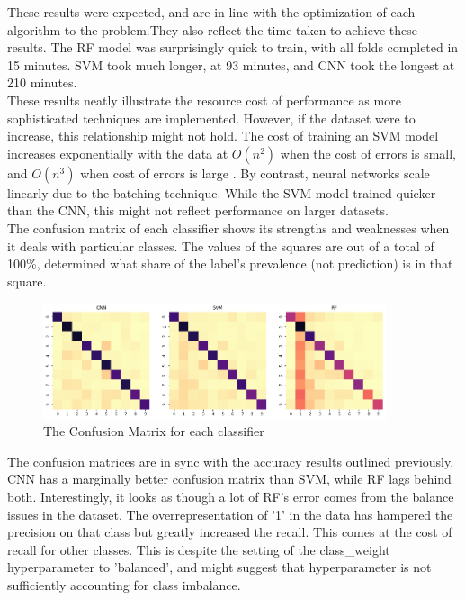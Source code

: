 \documentclass[12pt]{article}
\begin{document}
These results were expected, and are in line with the optimization of each algorithm to the problem.They also reflect the time taken to achieve these results. The RF model was surprisingly quick to train, with all folds completed in 15 minutes. SVM took much longer, at 93 minutes, and CNN took the longest at 210 minutes.\\

These results neatly illustrate the resource cost of performance as more sophisticated techniques are implemented. However, if the dataset were to increase, this relationship might not hold. The cost of training an SVM model increases exponentially with the data at $O(n^2)$ when the cost of errors is small, and $O(n^3)$ when cost of errors is large \citep{algoperformance}. By contrast, neural networks scale linearly due to the batching technique. While the SVM model trained quicker than the CNN, this might not reflect performance on larger datasets.\\

The confusion matrix of each classifier shows its strengths and weaknesses when it deals with particular classes. The values of the squares are out of a total of 100\%, determined what share of the label's prevalence (not prediction) is in that square.\\
\begin{figure}[h]
\caption{The Confusion Matrix for each classifier}
\centering
\includegraphics[width=0.9\textwidth]{images/cm_all.png}
\end{figure}

The confusion matrices are in sync with the accuracy results outlined previously. CNN has a marginally better confusion matrix than SVM, while RF lags behind both. Interestingly, it looks as though a lot of RF's error comes from the balance issues in the dataset. The overrepresentation of '1' in the data has hampered the precision on that class but greatly increased the recall. This comes at the cost of recall for other classes. This is despite the setting of the class\_weight hyperparameter to 'balanced', and might suggest that hyperparameter is not sufficiently accounting for class imbalance.\\
\end{document}
